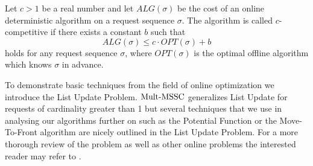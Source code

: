 \begin{definition}\label{comp-ratio}
Let $c > 1$ be a real number and let $ALG(\sigma)$ be the cost of an online deterministic algorithm on a request sequence $\sigma$. The algorithm is called $c$-competitive
if there exists a constant $b$ such that
$$ALG(\sigma) \leq c \cdot OPT(\sigma)+b $$ 
holds for any request sequence $\sigma$, where $OPT(\sigma)$ is the optimal offline algorithm which knows $\sigma$ in advance. 
\end{definition}

To demonstrate basic techniques from the field of online optimization we introduce the List Update Problem. $\mathrm{Mult}\text{-}\mathrm{MSSC}$ generalizes List Update for requests of cardinality greater than 1 but several techniques that we use in analysing our algorithms further on such as the Potential Function or the Move-To-Front algorithm are nicely outlined in the List Update Problem. For a more thorough review of the problem as well as other online problems the interested reader may refer to \cite{Albers98, ASW95, tim16, ST85}.



